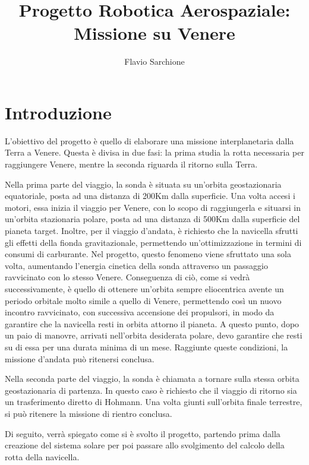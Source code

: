 \documentclass[a4paper]{article}
\begin{document}
\author{Flavio Sarchione}
\title{Progetto Robotica Aerospaziale: Missione su Venere}
\maketitle
\newpage

\part{Introduzione}
\pagestyle{plain}

L'obiettivo del progetto è quello di elaborare una missione interplanetaria dalla Terra a Venere. Questa è divisa in due fasi: la prima studia la rotta necessaria per raggiungere Venere, mentre la seconda riguarda il ritorno sulla Terra.

Nella prima parte del viaggio, la sonda è situata su un'orbita geostazionaria equatoriale, posta ad una distanza di 200Km dalla superficie. Una volta accesi i motori, essa inizia il viaggio per Venere, con lo scopo di raggiungerla e situarsi in un'orbita stazionaria polare, posta ad una distanza di 500Km dalla superficie del pianeta target.
Inoltre, per il viaggio d'andata, è richiesto che la navicella sfrutti gli effetti della fionda gravitazionale, permettendo un'ottimizzazione in termini di consumi di carburante. Nel progetto, questo fenomeno viene sfruttato una sola volta, aumentando l'energia cinetica della sonda attraverso un passaggio ravvicinato con lo stesso Venere. Conseguenza di ciò, come si vedrà successivamente, è quello di ottenere un'orbita sempre eliocentrica avente un periodo orbitale molto simile a quello di Venere, permettendo così un nuovo incontro ravvicinato, con successiva accensione dei propulsori, in modo da garantire che la navicella resti in orbita attorno il pianeta. A questo punto, dopo un paio di manovre, arrivati nell'orbita desiderata polare, devo garantire che resti su di essa per una durata minima di un mese. Raggiunte queste condizioni, la missione d'andata può ritenersi conclusa.

Nella seconda parte del viaggio, la sonda è chiamata a tornare sulla stessa orbita geostazionaria di partenza.
In questo caso è richiesto che il viaggio di ritorno sia un trasferimento diretto di Hohmann. Una volta giunti sull'orbita finale terrestre, si può ritenere la missione di rientro conclusa.

Di seguito, verrà spiegato come si è svolto il progetto, partendo prima dalla creazione del sistema solare per poi passare allo svolgimento del calcolo della rotta della navicella.
\newpage
\end{document}
